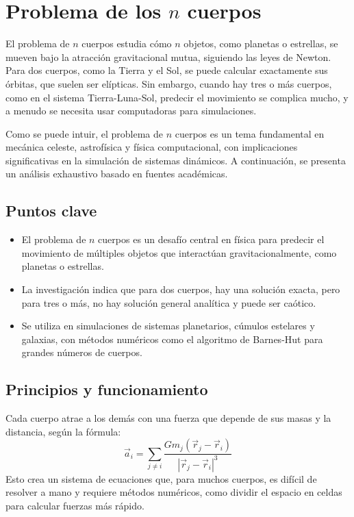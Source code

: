 \section{Problema de los \texorpdfstring{$n$}{n} cuerpos}\label{sec:n-body_problem}

El problema de $n$ cuerpos estudia cómo $n$ objetos, como planetas o estrellas, se mueven bajo la atracción gravitacional mutua, siguiendo las leyes de Newton. Para dos cuerpos, como la Tierra y el Sol, se puede calcular exactamente sus órbitas, que suelen ser elípticas. Sin embargo, cuando hay tres o más cuerpos, como en el sistema Tierra-Luna-Sol, predecir el movimiento se complica mucho, y a menudo se necesita usar computadoras para simulaciones.

Como se puede intuir, el problema de $n$ cuerpos es un tema fundamental en mecánica celeste, astrofísica y física computacional, con implicaciones significativas en la simulación de sistemas dinámicos. A continuación, se presenta un análisis exhaustivo basado en fuentes académicas.

\subsection{Puntos clave}
\begin{itemize}
    \item El problema de $n$ cuerpos es un desafío central en física para predecir el movimiento de múltiples objetos que interactúan gravitacionalmente, como planetas o estrellas.
    \item La investigación indica que para dos cuerpos, hay una solución exacta, pero para tres o más, no hay solución general analítica y puede ser caótico.
    \item Se utiliza en simulaciones de sistemas planetarios, cúmulos estelares y galaxias, con métodos numéricos como el algoritmo de Barnes-Hut para grandes números de cuerpos.
\end{itemize}

\subsection{Principios y funcionamiento}
Cada cuerpo atrae a los demás con una fuerza que depende de sus masas y la distancia, según la fórmula:
\begin{equation}
    \vec{a}_i = \sum_{j \neq i} \frac{G m_j (\vec{r}_j - \vec{r}_i)}{|\vec{r}_j - \vec{r}_i|^3}
\end{equation}
Esto crea un sistema de ecuaciones que, para muchos cuerpos, es difícil de resolver a mano y requiere métodos numéricos, como dividir el espacio en celdas para calcular fuerzas más rápido.

